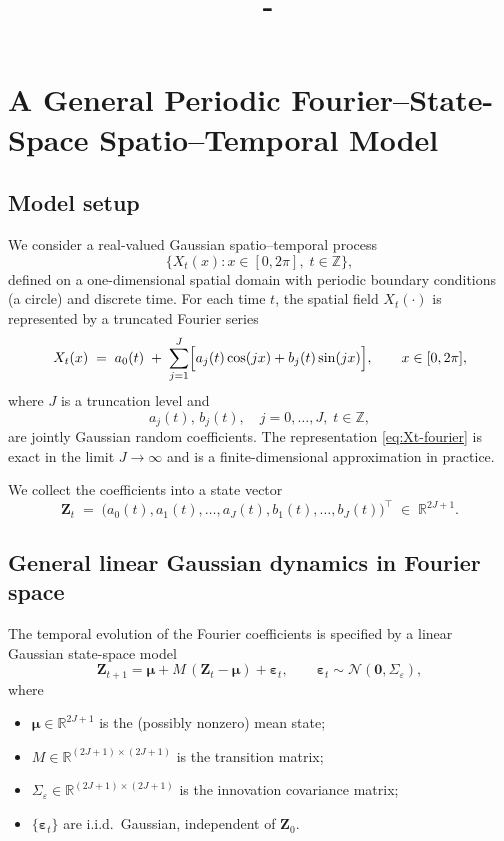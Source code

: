 \documentclass[answers,12pt,addpoints]{exam}
\author{\name}
\title{\course \ - \assignment}
\begin{document}
\maketitle

\newpage
\section{A General Periodic Fourier--State-Space Spatio--Temporal Model}

\subsection{Model setup}

We consider a real-valued Gaussian spatio--temporal process
\[
  \{X_t(x) : x \in [0,2\pi],\; t \in \mathbb{Z}\},
\]
defined on a one-dimensional spatial domain with periodic boundary conditions (a circle) and discrete time. For each time $t$, the spatial field $X_t(\cdot)$ is represented by a truncated Fourier series
\begin{equation}
  X_t(x)
  \;=\;
  a_0(t)
  \;+\;
  \sum_{j=1}^{J}
    \Bigl[
      a_j(t)\cos(jx) + b_j(t)\sin(jx)
    \Bigr],
  \qquad x \in [0,2\pi],
  \label{eq:Xt-fourier}
\end{equation}
where $J$ is a truncation level and
\[
  a_j(t),\, b_j(t), \quad j=0,\dots,J,\; t\in\mathbb{Z},
\]
are jointly Gaussian random coefficients. The representation \eqref{eq:Xt-fourier} is exact in the limit $J\to\infty$ and is a finite-dimensional approximation in practice.

We collect the coefficients into a state vector
\begin{equation}
  \mathbf{Z}_t
  \;=\;
  \bigl(a_0(t), a_1(t),\dots,a_J(t), b_1(t),\dots,b_J(t)\bigr)^\top
  \;\in\; \mathbb{R}^{2J+1}.
  \label{eq:state-vector}
\end{equation}

\subsection{General linear Gaussian dynamics in Fourier space}

The temporal evolution of the Fourier coefficients is specified by a linear Gaussian state-space model
\begin{equation}
  \mathbf{Z}_{t+1}
  =
  \boldsymbol{\mu}
  +
  M\,(\mathbf{Z}_t - \boldsymbol{\mu})
  +
  \boldsymbol{\varepsilon}_t,
  \qquad
  \boldsymbol{\varepsilon}_t \sim \mathcal{N}(\mathbf{0}, \Sigma_\varepsilon),
  \label{eq:Zt-state-space}
\end{equation}
where
\begin{itemize}
  \item $\boldsymbol{\mu} \in \mathbb{R}^{2J+1}$ is the (possibly nonzero) mean state;
  \item $M \in \mathbb{R}^{(2J+1)\times(2J+1)}$ is the transition matrix;
  \item $\Sigma_\varepsilon \in \mathbb{R}^{(2J+1)\times(2J+1)}$ is the innovation covariance matrix;
  \item $\{\boldsymbol{\varepsilon}_t\}$ are i.i.d.\ Gaussian, independent of $\mathbf{Z}_0$.
\end{itemize}
\end{document}
